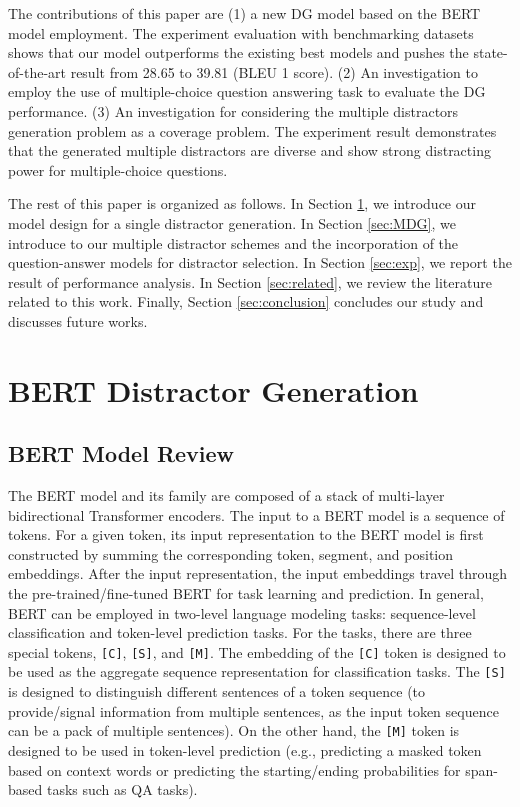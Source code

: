 \documentclass[11pt,a4paper]{article}
\begin{document}
The contributions of this paper are (1) a new DG model based on the BERT model employment. The experiment evaluation with benchmarking datasets shows that our model outperforms the existing best models \cite{zhou2019coattention} and pushes the state-of-the-art result from 28.65 to 39.81 (BLEU 1 score). (2) An investigation to employ the use of multiple-choice question answering task to evaluate the DG performance. (3) An investigation for considering the multiple distractors generation problem as a coverage problem. The experiment result demonstrates that the generated multiple distractors are diverse and show strong distracting power for multiple-choice questions.   











The rest of this paper is organized as follows. In Section \ref{sec:BDG}, we introduce our model design for a single distractor generation. In Section \ref{sec:MDG}, we introduce to our multiple distractor schemes and the incorporation of the question-answer models for distractor selection. In Section \ref{sec:exp}, we report the result of performance analysis. In Section \ref{sec:related}, we review the literature related to this work. Finally, Section \ref{sec:conclusion} concludes our study and discusses future works.  \section{BERT Distractor Generation}\label{sec:BDG}

\subsection{BERT Model Review}
The BERT model and its family \cite{liu2019roberta,lan2019albert} are composed of a stack of multi-layer bidirectional Transformer encoders. The input to a BERT model is a sequence of tokens. For a given token, its input representation to the BERT model is first constructed by summing the corresponding token, segment, and position embeddings. After the input representation, the input embeddings travel through the pre-trained/fine-tuned BERT for task learning and prediction. In general, BERT can be employed in two-level language modeling tasks: sequence-level classification and token-level prediction tasks. For the tasks, there are three special tokens, \texttt{[C]}, \texttt{[S]}, and \texttt{[M]}. The embedding of the \texttt{[C]} token is designed to be used as the aggregate sequence representation for classification tasks. The \texttt{[S]} is designed to distinguish different sentences of a token sequence (to provide/signal information from multiple sentences, as the input token sequence can be a pack of multiple sentences). On the other hand, the \texttt{[M]} token is designed to be used in token-level prediction (e.g., predicting a masked token based on context words or predicting the starting/ending probabilities for span-based tasks such as QA tasks).
\end{document}
